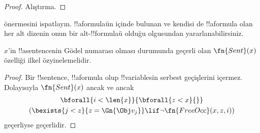 \documentclass[../../../include/open-logic-section]{subfiles}
\begin{document}
\begin{proof}
Alıştırma.
\end{proof}

\begin{prob}
 önermesini ispatlayın.
!!a{formula}{}ün içinde bulunan ve kendisi de !!a{formula} olan her alt
dizenin onun bir alt-!!{formula}{}ü olduğu olgusundan yararlanabilirsiniz.
\end{prob}

\begin{prop}
$x$'in !!a{sentence}{}nin Gödel numarası olması durumunda geçerli olan
$\fn{Sent}(x)$ özelliği ilkel özyinelemelidir.
\end{prop}

\begin{proof}
Bir !!{sentence}, !!a{formula} olup !!{variable}s{}in serbest geçişlerini içermez.
Dolayısıyla $\fn{Sent}(x)$ ancak ve ancak
\begin{multline*}
\bforall{i<\len{x}}{\bforall{z<x}{}}\\
(\bexists{j<z}{z=\Gn{\Obj v_j}} \lif \lnot\fn{FreeOcc}(x,z,i))
\end{multline*}
geçerliyse geçerlidir.
\end{proof}
\end{document}
